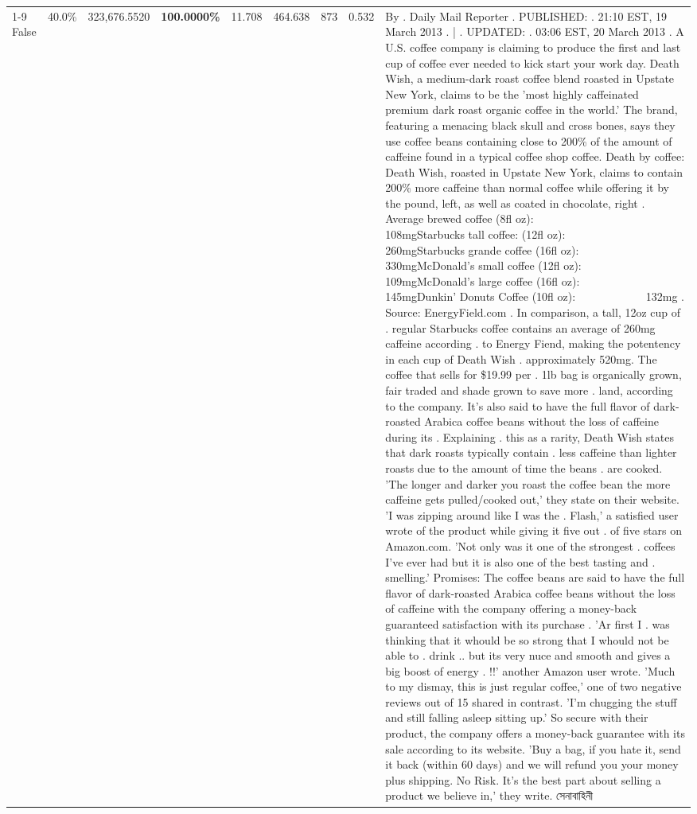 \begin{table}[H]
{\begin{tabular}{lllrlllll}
\cline{1-9}
False & 40.0\% & 323,676.5520 & \bfseries \color{red} 100.0000\% & 11.708 & 464.638 & 873 & 0.532 & By . Daily Mail Reporter . PUBLISHED: . 21:10 EST, 19 March 2013 . | . UPDATED: . 03:06 EST, 20 March 2013 . A U.S. coffee company is claiming to produce the first and last cup of coffee ever needed to kick start your work day. Death Wish, a medium-dark roast coffee blend roasted in Upstate New York, claims to be the 'most highly caffeinated premium dark roast organic coffee in the world.' The brand, featuring a menacing black skull and cross bones, says they use coffee beans containing close to 200\% of the amount of caffeine found in a typical coffee shop coffee. Death by coffee: Death Wish, roasted in Upstate New York, claims to contain 200\% more caffeine than normal coffee while offering it by the pound, left, as well as coated in chocolate, right . Average brewed coffee (8fl oz):              108mgStarbucks tall coffee: (12fl oz):                260mgStarbucks grande coffee (16fl oz):         330mgMcDonald's small coffee (12fl oz):           109mgMcDonald's large coffee (16fl oz):           145mgDunkin' Donuts Coffee (10fl oz):             132mg . Source: EnergyField.com . In comparison, a tall, 12oz cup of . regular Starbucks coffee contains an average of 260mg caffeine according . to Energy Fiend, making the potentency in each cup of Death Wish . approximately 520mg. The coffee that sells for \$19.99 per . 1lb bag is organically grown, fair traded and shade grown to save more . land, according to the company. It's also said to have the full flavor of dark-roasted Arabica coffee beans without the loss of caffeine during its . Explaining . this as a rarity, Death Wish states that dark roasts typically contain . less caffeine than lighter roasts due to the amount of time the beans . are cooked. 'The longer and darker you roast the coffee bean the more caffeine gets pulled/cooked out,' they state on their website. 'I was zipping around like I was the . Flash,' a satisfied user wrote of the product while giving it five out . of five stars on Amazon.com. 'Not only was it one of the strongest . coffees I've ever had but it is also one of the best tasting and . smelling.’ Promises: The coffee beans are said to have the full flavor of dark-roasted Arabica coffee beans without the loss of caffeine with the company offering a money-back guaranteed satisfaction with its purchase . 'Ar first I . was thinking that it whould be so strong that I whould not be able to . drink .. but its very nuce and smooth and gives a big boost of energy . !!' another Amazon user wrote. 'Much to my dismay, this is just regular coffee,' one of two negative reviews out of 15 shared in contrast. 'I'm chugging the stuff and still falling asleep sitting up.' So secure with their product, the company offers a money-back guarantee with its sale according to its website. 'Buy a bag, if you hate it, send it back (within 60 days) and we will refund you your money plus shipping. No Risk. It’s the best part about selling a product we believe in,' they write. সেনাবাহিনী \\

\end{tabular}}
\end{table}

